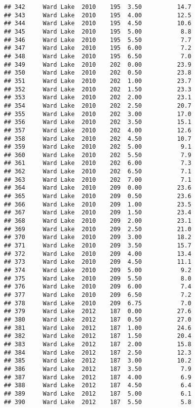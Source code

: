 \documentclass[
]{article}
\begin{document}
\begin{verbatim}
## 342     Ward Lake  2010    195  3.50          14.7
## 343     Ward Lake  2010    195  4.00          12.5
## 344     Ward Lake  2010    195  4.50          10.6
## 345     Ward Lake  2010    195  5.00           8.8
## 346     Ward Lake  2010    195  5.50           7.7
## 347     Ward Lake  2010    195  6.00           7.2
## 348     Ward Lake  2010    195  6.50           7.0
## 349     Ward Lake  2010    202  0.00          23.9
## 350     Ward Lake  2010    202  0.50          23.8
## 351     Ward Lake  2010    202  1.00          23.7
## 352     Ward Lake  2010    202  1.50          23.3
## 353     Ward Lake  2010    202  2.00          23.1
## 354     Ward Lake  2010    202  2.50          20.7
## 355     Ward Lake  2010    202  3.00          17.0
## 356     Ward Lake  2010    202  3.50          15.1
## 357     Ward Lake  2010    202  4.00          12.6
## 358     Ward Lake  2010    202  4.50          10.7
## 359     Ward Lake  2010    202  5.00           9.1
## 360     Ward Lake  2010    202  5.50           7.9
## 361     Ward Lake  2010    202  6.00           7.3
## 362     Ward Lake  2010    202  6.50           7.1
## 363     Ward Lake  2010    202  7.00           7.1
## 364     Ward Lake  2010    209  0.00          23.6
## 365     Ward Lake  2010    209  0.50          23.6
## 366     Ward Lake  2010    209  1.00          23.5
## 367     Ward Lake  2010    209  1.50          23.4
## 368     Ward Lake  2010    209  2.00          23.1
## 369     Ward Lake  2010    209  2.50          21.0
## 370     Ward Lake  2010    209  3.00          18.2
## 371     Ward Lake  2010    209  3.50          15.7
## 372     Ward Lake  2010    209  4.00          13.4
## 373     Ward Lake  2010    209  4.50          11.1
## 374     Ward Lake  2010    209  5.00           9.2
## 375     Ward Lake  2010    209  5.50           8.0
## 376     Ward Lake  2010    209  6.00           7.4
## 377     Ward Lake  2010    209  6.50           7.2
## 378     Ward Lake  2010    209  6.75           7.0
## 379     Ward Lake  2012    187  0.00          27.6
## 380     Ward Lake  2012    187  0.50          27.0
## 381     Ward Lake  2012    187  1.00          24.6
## 382     Ward Lake  2012    187  1.50          20.4
## 383     Ward Lake  2012    187  2.00          15.8
## 384     Ward Lake  2012    187  2.50          12.3
## 385     Ward Lake  2012    187  3.00          10.2
## 386     Ward Lake  2012    187  3.50           7.9
## 387     Ward Lake  2012    187  4.00           6.9
## 388     Ward Lake  2012    187  4.50           6.4
## 389     Ward Lake  2012    187  5.00           6.1
## 390     Ward Lake  2012    187  5.50           5.8

\end{verbatim}
\end{document}
